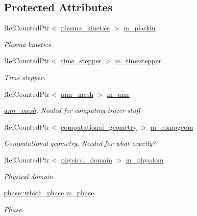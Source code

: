 \subsection*{Protected Attributes}
\begin{DoxyCompactItemize}
\item 
Ref\+Counted\+Ptr$<$ \hyperlink{classplasma__kinetics}{plasma\+\_\+kinetics} $>$ \hyperlink{classcell__tagger_a1075ac078698fb7abb5c011a06f32a5c}{m\+\_\+plaskin}
\begin{DoxyCompactList}\small\item\em Plasma kinetics. \end{DoxyCompactList}\item 
Ref\+Counted\+Ptr$<$ \hyperlink{classtime__stepper}{time\+\_\+stepper} $>$ \hyperlink{classcell__tagger_a6cb59731dd7aee8369318cfe5fb6823a}{m\+\_\+timestepper}
\begin{DoxyCompactList}\small\item\em Time stepper. \end{DoxyCompactList}\item 
Ref\+Counted\+Ptr$<$ \hyperlink{classamr__mesh}{amr\+\_\+mesh} $>$ \hyperlink{classcell__tagger_aa407e73dc8492c49793be861259ea53e}{m\+\_\+amr}
\begin{DoxyCompactList}\small\item\em \hyperlink{classamr__mesh}{amr\+\_\+mesh}. Needed for computing tracer stuff \end{DoxyCompactList}\item 
Ref\+Counted\+Ptr$<$ \hyperlink{classcomputational__geometry}{computational\+\_\+geometry} $>$ \hyperlink{classcell__tagger_a2942ec128b7fb96be3d02219054bd451}{m\+\_\+compgeom}
\begin{DoxyCompactList}\small\item\em Computational geometry. Needed for what exactly? \end{DoxyCompactList}\item 
Ref\+Counted\+Ptr$<$ \hyperlink{classphysical__domain}{physical\+\_\+domain} $>$ \hyperlink{classcell__tagger_ad176575b6ece539b8131a1aa12e4f2f7}{m\+\_\+physdom}
\begin{DoxyCompactList}\small\item\em Physical domain. \end{DoxyCompactList}\item 
\hyperlink{namespacephase_a23c76f548a5eb1955ed8c929c541108b}{phase\+::which\+\_\+phase} \hyperlink{classcell__tagger_a1495ba566a901891655afcc35ac05a3f}{m\+\_\+phase}
\begin{DoxyCompactList}\small\item\em Phase. \end{DoxyCompactList}\item 

\end{DoxyCompactItemize}
